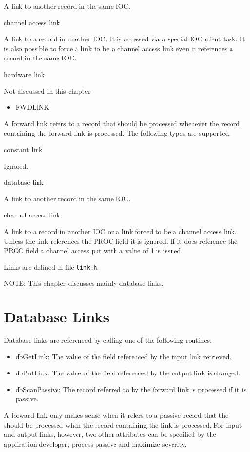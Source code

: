A link to another record in the same IOC.

channel access link

A link to a record in another IOC. It is accessed via a special IOC client task. It is also possible to force a 
link to be a channel access link even it references a record in the same IOC.

hardware link

Not discussed in this chapter

\begin{itemize}\item {}FWDLINK

\end{itemize}\begin{description}\item A forward link refers to a record that should be processed whenever the record containing the forward link is 
processed. The following types are supported:

\end{description}constant link

Ignored.

database link

A link to another record in the same IOC.

channel access link

A link to a record in another IOC or a link forced to be a channel access link. Unless the link references the 
PROC field it is ignored. If it does reference the PROC field a channel access put with a value of 1 is issued.

Links are defined in file \verb|link.h|.

NOTE: This chapter discusses mainly database links.

\section{Database Links}

Database links are referenced by calling one of the following routines:

\begin{itemize}\item {}dbGetLink: The value of the field referenced by the input link retrieved.

\item {}dbPutLink: The value of the field referenced by the output link is changed.

\item {}dbScanPassive: The record referred to by the forward link is processed if it is passive.

\end{itemize}A forward link only makes sense when it refers to a passive record that the should be processed when the record 
containing the link is processed. For input and output links, however, two other attributes can be specified by the 
application developer, process passive and maximize severity.

